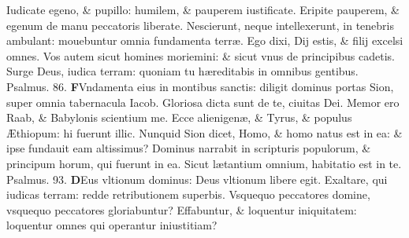 \documentclass[a5paper,10pt]{book}
\def\ae{æ}
\def\AE{Æ}
\begin{document}
\begin{multicols*}{2}
\newline \color{red} I\color{black}udicate egeno, \& pupillo: humilem, \& pauperem iustificate.
\newline \color{red} E\color{black}ripite pauperem, \& egenum de manu peccatoris liberate.
\newline \color{red} N\color{black}escierunt, neque intellexerunt, in tenebris ambulant: mouebuntur omnia fundamenta terr\ae .
\newline \color{red} E\color{black}go dixi, Dij estis, \& filij excelsi omnes.
\newline \color{red} V\color{black}os autem sicut homines moriemini: \& sicut vnus de principibus cadetis.
\newline \color{red} S\color{black}urge Deus, iudica terram: quoniam tu h\ae reditabis in omnibus gentibus.
\newline \color{red} Psalmus. \hypertarget{ps86}{86.} \color{black}
\vspace{-.25em}
\lettrine[lines=2]{\bfseries \color{red} F}{}Vndamenta eius in montibus sanctis: diligit dominus portas Sion, super omnia tabernacula Iacob.
\newline \color{red} G\color{black}loriosa dicta sunt de te, ciuitas Dei.
\newline \color{red} M\color{black}emor ero Raab, \& Babylonis scientium me.%
\newline \color{red} E\color{black}cce alienigen\ae , \& Tyrus, \& populus \AE thiopum: hi fuerunt illic.
\newline \color{red} N\color{black}unquid Sion dicet, Homo, \& homo natus est in ea: \& ipse fundauit eam altissimus?
\newline \color{red} D\color{black}ominus narrabit in scripturis populorum, \& principum horum, qui fuerunt in ea.
\newline \color{red} S\color{black}icut l\ae tantium omnium, habitatio est in te. \quad \color{red} Psalmus. \hypertarget{ps93}{93.} \color{black}
\vspace{-.25em}
\lettrine[lines=2]{\bfseries \color{red} D}{}Eus vltionum dominus: Deus vltionum libere egit.
\newline \color{red} E\color{black}xaltare, qui iudicas terram: redde retributionem superbis.
\newline \color{red} V\color{black}squequo peccatores domine, vsquequo peccatores gloriabuntur?
\newline \color{red} E\color{black}ffabuntur, \& loquentur iniquitatem: loquentur omnes qui operantur iniustitiam?

\end{multicols*}
\end{document}
